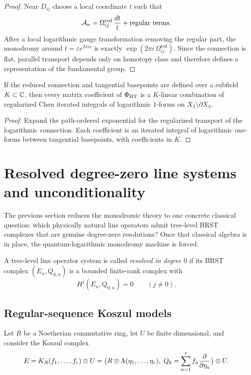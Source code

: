 \begin{proof}
Near $D_{ij}$ choose a local coordinate $t$ such that
\[
 \mathcal A_n=\Omega_{ij}^{\mathrm{red}}\,\frac{dt}{t}+\text{regular terms}.
\]
After a local logarithmic gauge transformation removing the regular part, the monodromy around $t=\varepsilon e^{2\pi is}$ is exactly $\exp(2\pi i\,\Omega_{ij}^{\mathrm{red}})$. Since the connection is flat, parallel transport depends only on homotopy class and therefore defines a representation of the fundamental group.
\end{proof}

\begin{corollary}%
If the reduced connection and tangential basepoints are defined over a subfield $K\subset\mathbb C$, then every matrix coefficient of $\Phi_{\mathrm{HT}}$ is a $K$-linear combination of regularized Chen iterated integrals of logarithmic $1$-forms on $X_3\setminus\partial X_3$.
\end{corollary}

\begin{proof}
Expand the path-ordered exponential for the regularized transport of the logarithmic connection. Each coefficient is an iterated integral of logarithmic one-forms between tangential basepoints, with coefficients in $K$.
\end{proof}

\section{Resolved degree-zero line systems and unconditionality}%

The previous section reduces the monodromic theory to one concrete classical question: which physically natural line operators admit tree-level BRST complexes that are genuine degree-zero resolutions? Once that classical algebra is in place, the quantum-logarithmic monodromy machine is forced.

\begin{definition}%
A tree-level line operator system is called \emph{resolved in degree $0$} if its BRST complex $(E_n,Q_{0,n})$ is a bounded finite-rank complex with
\[
 H^j(E_n,Q_{0,n})=0 \qquad (j\neq 0).
\]
\end{definition}

\subsection{Regular-sequence Koszul models}
Let $R$ be a Noetherian commutative ring, let $U$ be finite dimensional, and consider the Koszul complex
\[
 E = K_R(f_1,\dots,f_r)\otimes U
 = \big(R\otimes \Lambda(\eta_1,\dots,\eta_r),\;Q_0=\sum_{a=1}^r f_a\frac{\partial}{\partial\eta_a}\big)\otimes U.
\]

